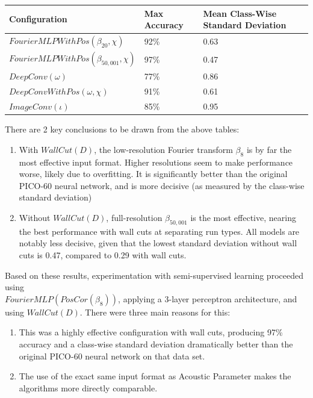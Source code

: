 \documentclass[10pt]{article}
\begin{document}
\begin{minipage}{\textwidth}
    \begin{center}
        \begin{tabular}{|l|l|l|}
            \hline
            Configuration & Max Accuracy & Mean Class-Wise Standard Deviation \\
            \hline
            $FourierMLPWithPos(\beta_{20}, \chi)$ & 92\% & 0.63 \\
            \hline
            $FourierMLPWithPos(\beta_{50,001}, \chi)$ & 97\% & 0.47 \\
            \hline
            $DeepConv(\omega)$ & 77\% & 0.86 \\
            \hline
            $DeepConvWithPos(\omega, \chi)$ & 91\% & 0.61 \\
            \hline
            $ImageConv(\iota)$ & 85\% & 0.95 \\
            \hline
        \end{tabular}
    \end{center}
\end{minipage}

There are 2 key conclusions to be drawn from the above tables:

\begin{enumerate}
    \item With $WallCut(D)$, the low-resolution Fourier transform $\beta_{8}$ is by far the most effective input format. Higher resolutions seem to make performance worse, likely due to overfitting. It is significantly better than the original PICO-60 neural network, and is more decisive (as measured by the class-wise standard deviation)
    \item Without $WallCut(D)$, full-resolution $\beta_{50,001}$ is the most effective, nearing the best performance with wall cuts at separating run types. All models are notably less decisive, given that the lowest standard deviation without wall cuts is 0.47, compared to 0.29 with wall cuts.
\end{enumerate}

Based on these results, experimentation with semi-supervised learning proceeded using \\ $FourierMLP(PosCor(\beta_{8}))$, applying a 3-layer perceptron architecture, and using $WallCut(D)$. There were three main reasons for this:

\begin{enumerate}
    \item This was a highly effective configuration with wall cuts, producing 97\% accuracy and a class-wise standard deviation dramatically better than the original PICO-60 neural network on that data set.
    \item The use of the exact same input format as Acoustic Parameter makes the algorithms more directly comparable.
\end{enumerate}
\end{document}
